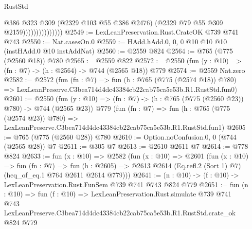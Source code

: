 \begin{lexlean}{RustStd}
\begin{coremodule}
                                @386
                                @323
                                @309
                                (@2329 @103 @55 @386 @2476)
                                (@2329 @79 @55 @309 @2159)))))))))))))))
@2549 := LexLeanPreservation.Rust.CrateOK @739 @741 @743
@2550 := Nat.casesOn.{0}
@2559 := HAdd.hAdd.{0, 0, 0} @10 @10 @10 (instHAdd.{0} @10 instAddNat)
@2560 := @2559 @824
@2564 := @765 (@775 (@2560 @18)) @780
@2565 := @2559 @822
@2572 := @2550 (fun (y : @10) => (fn : @7) -> (h : @2564) -> @744 (@2565 @18)) @779
@2574 := @2559 Nat.zero
@2582 := @2572
    (fun (fn : @7) =>
    fun (h : @765 (@775 (@2574 @18)) @780) =>
    LexLeanPreserve.C3bea714d4dc43384cb22cab75ca5e53b.R1.RustStd.fun0)
@2601 := @2550
    (fun (y : @10) => (fn : @7) -> (h : @765 (@775 (@2560 @23)) @780) -> @744 (@2565 @23))
    @779
    (fun (fn : @7) =>
    fun (h : @765 (@775 (@2574 @23)) @780) =>
    LexLeanPreserve.C3bea714d4dc43384cb22cab75ca5e53b.R1.RustStd.fun1)
@2605 := @765 (@775 (@2560 @28)) @780
@2610 := Option.noConfusion.{0, 0} (@744 (@2565 @28)) @7
@2611 := @305 @7
@2613 := @2610 @2611 @7
@2614 := @778 @824
@2633 := fun (x : @10) =>
  @2582
    (fun (x : @10) =>
    @2601
      (fun (x : @10) =>
      fun (fn : @7) =>
      fun (h : @2605) =>
      @2613 @2614 (Eq.refl.{2} (Sort 1) @7) (heq_of_eq.{1} @764 @2611 @2614 @779)))
@2641 := (n : @10) -> (f : @10) -> LexLeanPreservation.Rust.FunSem @739 @741 @743 @824 @779
@2651 := fun (n : @10) =>
  fun (f : @10) =>
  LexLeanPreservation.Rust.simulate
    @739
    @741
    @743
    LexLeanPreserve.C3bea714d4dc43384cb22cab75ca5e53b.R1.RustStd.crate_ok
    @824
    @779
\end{coremodule}
\end{lexlean}
